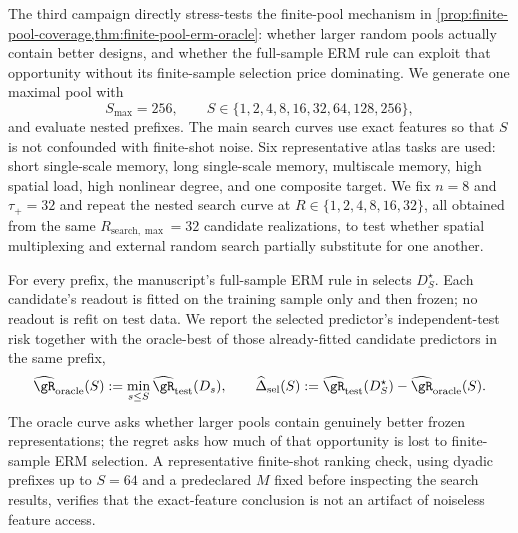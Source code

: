 The third campaign directly stress-tests the finite-pool mechanism in
\cref{prop:finite-pool-coverage,thm:finite-pool-erm-oracle}: whether larger
random pools actually contain better designs, and whether the full-sample ERM
rule can exploit that opportunity without its finite-sample selection price
dominating.  We generate one maximal pool with
\begin{equation}
    S_{\max}=256,
    \qquad
    S\in\{1,2,4,8,16,32,64,128,256\},
    \label{eq:S-grid}
\end{equation}
and evaluate nested prefixes.  The main search curves use exact features so
that $S$ is not confounded with finite-shot noise.  Six representative atlas
tasks are used: short single-scale memory, long single-scale memory,
multiscale memory, high spatial load, high nonlinear degree, and one composite
target.  We fix $n=8$ and $\tau_+=32$ and repeat the nested search curve at
$R\in\{1,2,4,8,16,32\}$, all obtained from the same
$R_{\mathrm{search},\max}=32$ candidate realizations, to test whether spatial
multiplexing and external random search partially substitute for one another.

For every prefix, the manuscript's full-sample ERM rule in
 selects $D_S^\star$.  Each candidate's readout is
fitted on the training sample only and then frozen; no readout is refit on test
data.  We report the selected predictor's independent-test risk together with
the oracle-best of those already-fitted candidate predictors in the same
prefix,
\begin{equation}
    \widehat\risk_{\mathrm{oracle}}(S)
      :=\min_{s\leq S}\widehat\risk_{\mathrm{test}}(D_s),
    \qquad
    \widehat\Delta_{\mathrm{sel}}(S)
      :=\widehat\risk_{\mathrm{test}}(D_S^\star)
       -\widehat\risk_{\mathrm{oracle}}(S).
    \label{eq:selection-regret}
\end{equation}
The oracle curve asks whether larger pools contain genuinely better frozen
representations; the regret asks how much of that opportunity is lost to
finite-sample ERM selection.  A
representative finite-shot ranking check, using dyadic prefixes up to $S=64$
and a predeclared $M$ fixed before inspecting the search results, verifies that
the exact-feature conclusion is not an artifact of noiseless feature access.


